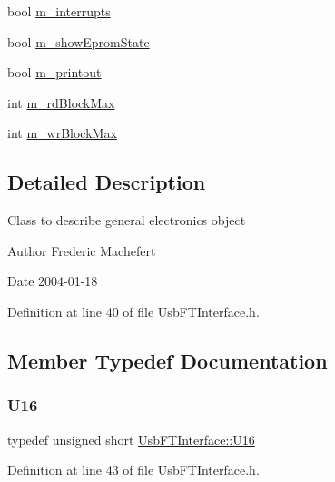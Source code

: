 \begin{DoxyCompactItemize}
\item 
bool \hyperlink{classUsbFTInterface_a0a6e3a781ead9833a413e230c6f8d1f4}{m\+\_\+interrupts}
\item 
bool \hyperlink{classUsbFTInterface_aa5c215777af41de94a2b371c59c88c7c}{m\+\_\+show\+Eprom\+State}
\item 
bool \hyperlink{classUsbFTInterface_aa4d5f5ffb4d3b26f1effdf84087aea91}{m\+\_\+printout}
\item 
int \hyperlink{classUsbFTInterface_a0f5050f1ed93392c8e5e4acaf7b75e1c}{m\+\_\+rd\+Block\+Max}
\item 
int \hyperlink{classUsbFTInterface_ad0512841c67ea39da7701e990628059a}{m\+\_\+wr\+Block\+Max}
\end{DoxyCompactItemize}


\subsection{Detailed Description}
Class to describe general electronics object

\begin{DoxyAuthor}{Author}
Frederic Machefert 
\end{DoxyAuthor}
\begin{DoxyDate}{Date}
2004-\/01-\/18 
\end{DoxyDate}


Definition at line 40 of file Usb\+F\+T\+Interface.\+h.



\subsection{Member Typedef Documentation}
\mbox{\label{classUsbFTInterface_a51f8cba75a1b8eb42ba2c6ba3841f80f}} 
\subsubsection{\texorpdfstring{U16}{U16}}
{\footnotesize\ttfamily typedef unsigned short \hyperlink{classUsbFTInterface_a51f8cba75a1b8eb42ba2c6ba3841f80f}{Usb\+F\+T\+Interface\+::\+U16}}



Definition at line 43 of file Usb\+F\+T\+Interface.\+h.

\mbox{\label{classUsbFTInterface_aee2201fe4d977aa03568fa8dbacc39ba}} 
